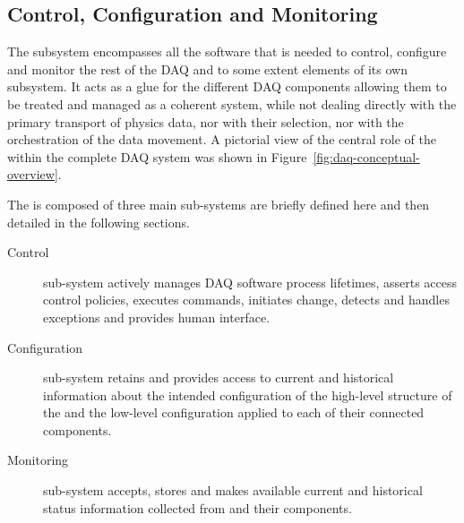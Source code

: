 \subsection{Control, Configuration and Monitoring}
\label{sec:fd-daq:design-run-control}


The  subsystem encompasses all the software that is needed to control, configure and monitor the rest of the DAQ and to some extent elements of its own subsystem. 
It acts as a glue for the different DAQ components allowing them to be treated and managed as a coherent system, while not dealing directly with the primary transport of physics data, nor with their selection, nor with the orchestration of the data movement. 
A pictorial view of the central role of the  within the complete DAQ system was shown in Figure~\ref{fig:daq-conceptual-overview}.

The  is composed of three main sub-systems are briefly defined here and then detailed in the following sections.
\begin{description}

\item[Control] sub-system actively manages DAQ software process lifetimes, asserts access control policies, executes commands, initiates change, detects and handles exceptions and provides human interface.


\item[Configuration] sub-system retains and provides access to current and historical information about the intended configuration of the high-level structure of the  and the low-level configuration applied to each of their connected components.

\item[Monitoring] sub-system accepts, stores and makes available current and historical status information collected from  and their components.

\end{description}

